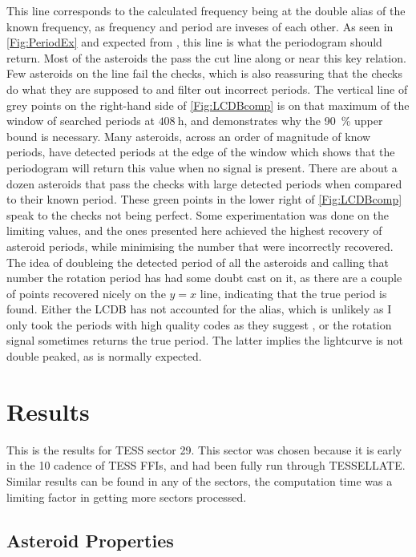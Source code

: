\documentclass{UCreport}
\begin{document}
This line corresponds to the calculated frequency being at the double alias of the known frequency, as frequency and period are inveses of each other.
As seen in \autoref{Fig:PeriodEx} and expected from \citet{McNeill2023}, this line is what the periodogram should return.
Most of the asteroids the pass the cut line along or near this key relation.
Few asteroids on the line fail the checks, which is also reassuring that the checks do what they are supposed to and filter out incorrect periods.
The vertical line of grey points on the right-hand side of \autoref{Fig:LCDBcomp} is on that maximum of the window of searched periods at $\qty{408}{\hour}$, and demonstrates why the \qty{90}{\percent} upper bound is necessary.
Many asteroids, across an order of magnitude of know periods, have detected periods at the edge of the window which shows that the periodogram will return this value when no signal is present.
There are about a dozen asteroids that pass the checks with large detected periods when compared to their known period. These green points in the lower right of \autoref{Fig:LCDBcomp} speak to the checks not being perfect.
Some experimentation was done on the limiting values, and the ones presented here achieved the highest recovery of asteroid periods, while minimising the number that were incorrectly recovered.
The idea of doubleing the detected period of all the asteroids and calling that number the rotation period has had some doubt cast on it, as there are a couple of points recovered nicely on the $y=x$ line, indicating that the true period is found.
Either the LCDB has not accounted for the alias, which is unlikely as I only took the periods with high quality codes as they suggest \citep{Warner2009}, or the rotation signal sometimes returns the true period.
The latter implies the lightcurve is not double peaked, as is normally expected.


\section{Results}\label{Sec:Res}

This is the results for TESS sector 29.
This sector was chosen because it is early in the \qty{10}{\min} cadence of TESS FFIs, and had been fully run through TESSELLATE.
Similar results can be found in any of the sectors, the computation time was a limiting factor in getting more sectors processed.

\subsection{Asteroid Properties}\label{SubSec:AstPropRes}
\end{document}

